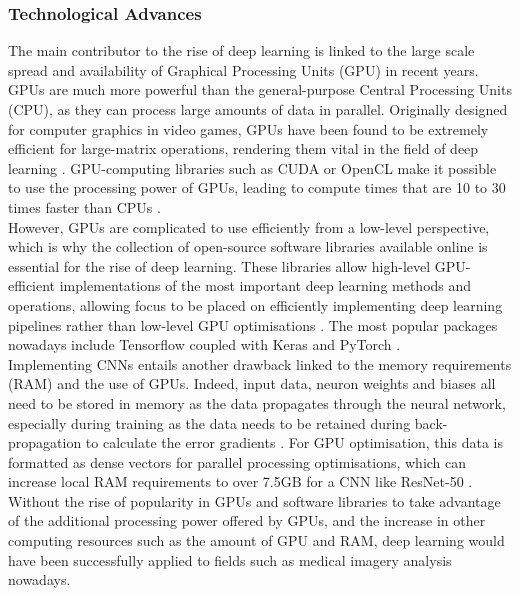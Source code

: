\subsubsection{Technological Advances}

The main contributor to the rise of deep learning is linked to the large scale spread and availability of  Graphical Processing Units (GPU) in recent years. GPUs are much more powerful than the general-purpose Central Processing Units (CPU), as they can process large amounts of data in parallel. Originally designed for computer graphics in video games, GPUs have been found to be extremely efficient for large-matrix operations, rendering them vital in the field of deep learning \citep{Caulfield2009}. GPU-computing libraries such as CUDA or OpenCL make it possible to use the processing power of GPUs, leading to compute times that are 10 to 30 times faster than CPUs \citep{Litjens2017}.\\

However, GPUs are complicated to use efficiently from a low-level perspective, which is why the collection of open-source software libraries available online is essential for the rise of deep learning. These libraries allow high-level GPU-efficient implementations of the most important deep learning methods and operations, allowing focus to be placed on efficiently implementing deep learning pipelines rather than low-level GPU optimisations \citep{Litjens2017}. The most popular packages nowadays include Tensorflow \citep{tensorflow2015-whitepaper} coupled with Keras \citep{chollet2015keras} and PyTorch \citep{pytorch}.\\

Implementing CNNs entails another drawback linked to the memory requirements (RAM) and the use of GPUs. Indeed, input data, neuron weights and biases all need to be stored in memory as the data propagates through the neural network, especially during training as the data needs to be retained during back-propagation to calculate the error gradients \citep{Geron2019}. For GPU optimisation, this data is formatted as dense vectors for parallel processing optimisations, which can increase local RAM requirements to over 7.5GB for a CNN like ResNet-50 \citep{Hanlon2016}.\\

Without the rise of popularity in GPUs and software libraries to take advantage of the additional processing power offered by GPUs, and the increase in other computing resources such as the amount of GPU and RAM, deep learning would have been successfully applied to fields such as medical imagery analysis nowadays.
